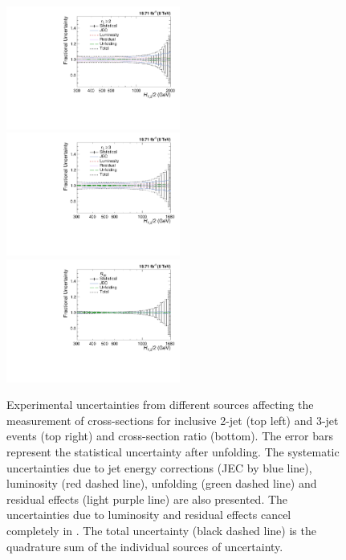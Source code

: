 \begin{figure}[!h]
 \begin{center}
 \hspace*{-3mm}\includegraphics[width=0.51\textwidth]{Plots_HT_2_150/Total_unc_all_2_NLO_add.pdf}%
 ~~\includegraphics[width=0.51\textwidth]{Plots_HT_2_150/Total_unc_all_3_NLO_add.pdf}\\
 \includegraphics[width=0.51\textwidth]{Plots_HT_2_150/Total_Unc_ratio_32_direct_add.pdf}
 \caption[Experimental uncertainties from different sources affecting the measurement of cross-sections and cross-section ratio.]{Experimental uncertainties from different sources affecting the measurement of cross-sections for inclusive 2-jet (top left) and 3-jet events (top right) and cross-section ratio \ratio (bottom). The error bars represent the statistical uncertainty after unfolding. The systematic uncertainties due to jet energy corrections (JEC by blue line), luminosity (red dashed line), unfolding (green dashed line) and residual effects (light purple line) are also presented. The uncertainties due to luminosity and residual effects cancel completely in \ratio. The total uncertainty (black dashed line) is the quadrature sum of the individual sources of uncertainty.}
 \label{fig:exp_unc}
 \end{center}
\end{figure}

